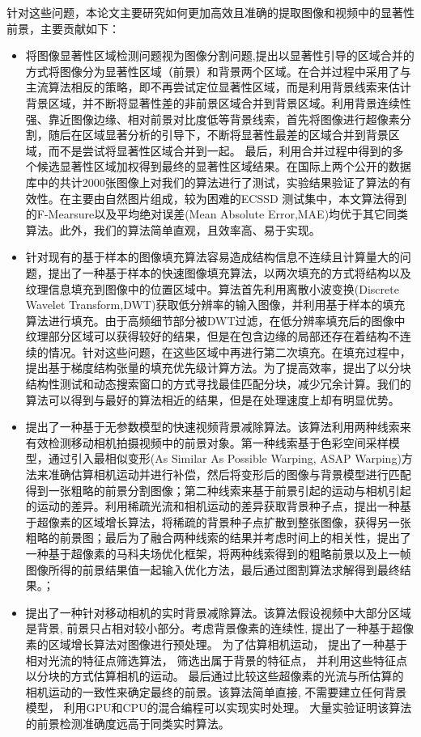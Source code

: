 \par
针对这些问题，本论文主要研究如何更加高效且准确的提取图像和视频中的显著性前景，主要贡献如下：
 \begin{itemize}
    \item 将图像显著性区域检测问题视为图像分割问题,提出以显著性引导的区域合并的方式将图像分为显著性区域（前景）和背景两个区域。在合并过程中采用了与主流算法相反的策略，即不再尝试定位显著性区域，而是利用背景线索来估计背景区域，并不断将显著性差的非前景区域合并到背景区域。利用背景连续性强、靠近图像边缘、相对前景对比度低等背景线索，首先将图像进行超像素分割，随后在区域显著分析的引导下，不断将显著性最差的区域合并到背景区域，而不是尝试将显著性区域合并到一起。 最后，利用合并过程中得到的多个候选显著性区域加权得到最终的显著性区域结果。在国际上两个公开的数据库中的共计2000张图像上对我们的算法进行了测试，实验结果验证了算法的有效性。在主要由自然图片组成，较为困难的ECSSD 测试集中，本文算法得到的F-Mearsure以及平均绝对误差(Mean Absolute Error,MAE)均优于其它同类算法。此外，我们的算法简单直观，且效率高、易于实现。
    \item 针对现有的基于样本的图像填充算法容易造成结构信息不连续且计算量大的问题，提出了一种基于样本的快速图像填充算法，以两次填充的方式将结构以及纹理信息填充到图像中的位置区域中。算法首先利用离散小波变换(Discrete Wavelet Transform,DWT)获取低分辨率的输入图像，并利用基于样本的填充算法进行填充。由于高频细节部分被DWT过滤，在低分辨率填充后的图像中纹理部分区域可以获得较好的结果，但是在包含边缘的局部还存在着结构不连续的情况。针对这些问题，在这些区域中再进行第二次填充。在填充过程中，提出基于梯度结构张量的填充优先级计算方法。为了提高效率，提出了以分块结构性测试和动态搜索窗口的方式寻找最佳匹配分块，减少冗余计算。我们的算法可以得到与最好的算法相近的结果，但是在处理速度上却有明显优势。
    \item 提出了一种基于无参数模型的快速视频背景减除算法。该算法利用两种线索来有效检测移动相机拍摄视频中的前景对象。第一种线索基于色彩空间采样模型，通过引入最相似变形(As Similar As Possible Warping, ASAP Warping)方法来准确估算相机运动并进行补偿，然后将变形后的图像与背景模型进行匹配得到一张粗略的前景分割图像；第二种线索来基于前景引起的运动与相机引起的运动的差异。利用稀疏光流和相机运动的差异获取背景种子点，提出一种基于超像素的区域增长算法，将稀疏的背景种子点扩散到整张图像，获得另一张粗略的前景图；最后为了融合两种线索的结果并考虑时间上的相关性，提出了一种基于超像素的马科夫场优化框架，将两种线索得到的粗略前景以及上一帧图像所得的前景结果值一起输入优化方法，最后通过图割算法求解得到最终结果。；
    \item 提出了一种针对移动相机的实时背景减除算法。该算法假设视频中大部分区域是背景, 前景只占相对较小部分。考虑背景像素的连续性, 提出了一种基于超像素的区域增长算法对图像进行预处理。 为了估算相机运动， 提出了一种基于相对光流的特征点筛选算法， 筛选出属于背景的特征点， 并利用这些特征点以分块的方式估算相机的运动。 最后通过比较这些超像素的光流与所估算的相机运动的一致性来确定最终的前景。该算法简单直接, 不需要建立任何背景模型， 利用GPU和CPU的混合编程可以实现实时处理。 大量实验证明该算法的前景检测准确度远高于同类实时算法。
  \end{itemize}
